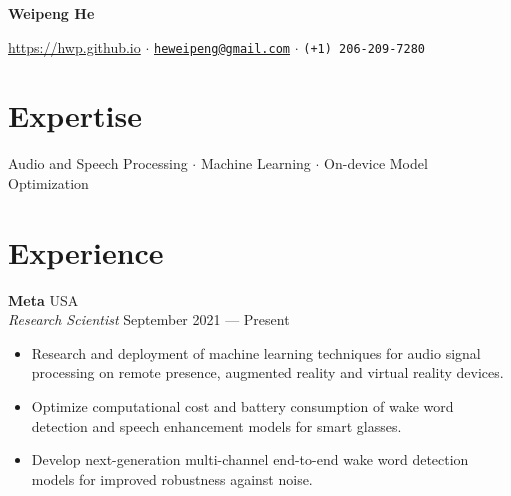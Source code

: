 \documentclass[a4paper,9pt]{extarticle} %
\begin{document}
\thispagestyle{empty}


\begin{center}
  {\Huge\bfseries\sffamily Weipeng He}

  \url{https://hwp.github.io} $\cdotp$
  \href{mailto:heweipeng@gmail.com}{\texttt{heweipeng@gmail.com}} $\cdotp$
  \texttt{(+1) 206-209-7280}
\end{center}


\section{Expertise}
\begin{center}
Audio and Speech Processing $\cdotp$ Machine Learning $\cdotp$ On-device Model Optimization
\end{center}


\section{Experience}

\textbf{Meta}  \hfill USA \\
\textit{Research Scientist} \hfill September 2021 --- Present%
\vspace{-.9\parskip}
\begin{itemize}
  \item Research and deployment of machine learning techniques for audio signal processing on remote presence, augmented reality and virtual reality devices.
  \item Optimize computational cost and battery consumption of wake word detection and speech enhancement models for smart glasses.
  \item Develop next-generation multi-channel end-to-end wake word detection models for improved robustness against noise.
\end{itemize}
\end{document}

